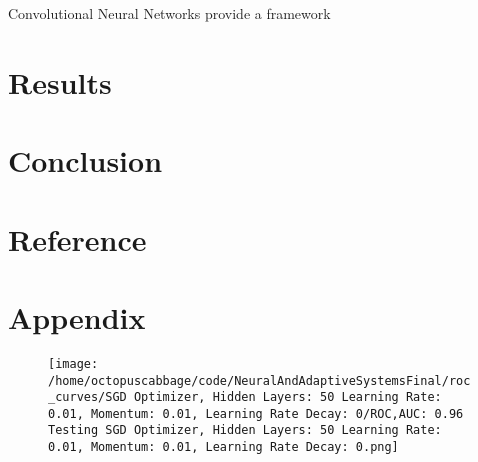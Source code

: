 \documentclass[]{article}
\begin{document}
Convolutional Neural Networks provide a framework 
\section{Results}
\section{Conclusion}
\section{Reference}
\section{Appendix}
\begin{figure}
\texttt{[image: /home/octopuscabbage/code/NeuralAndAdaptiveSystemsFinal/roc\_curves/SGD Optimizer, Hidden Layers: 50 Learning Rate: 0.01, Momentum: 0.01, Learning Rate Decay: 0/ROC,AUC: 0.96 Testing SGD Optimizer, Hidden Layers: 50 Learning Rate: 0.01, Momentum: 0.01, Learning Rate Decay: 0.png]}
\caption{}
\label{fig:ROC,AUC:0}
\end{figure}
\end{document}
